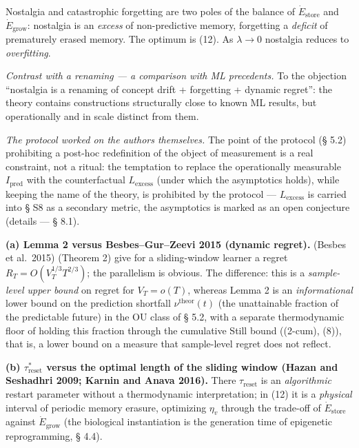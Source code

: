 \documentclass[pdflatex,sn-mathphys-ay]{sn-jnl}
\begin{document}
Nostalgia and catastrophic forgetting are two poles of the balance of \(\dot{E}_{\text{store}}\) and \(\dot{E}_{\text{grow}}\): nostalgia is an \emph{excess} of non-predictive memory, forgetting a \emph{deficit} of prematurely erased memory. The optimum is (12). As \(\lambda \to 0\) nostalgia reduces to \emph{overfitting}.



\emph{Contrast with a renaming --- a comparison with ML precedents.} To the objection ``nostalgia is a renaming of concept drift + forgetting + dynamic regret'': the theory contains constructions structurally close to known ML results, but operationally and in scale distinct from them.



\emph{The protocol worked on the authors themselves.} The point of the protocol (§ 5.2) prohibiting a post-hoc redefinition of the object of measurement is a real constraint, not a ritual: the temptation to replace the operationally measurable \(I_{\text{pred}}\) with the counterfactual \(L_{\text{excess}}\) (under which the asymptotics holds), while keeping the name of the theory, is prohibited by the protocol --- \(L_{\text{excess}}\) is carried into § S8 as a secondary metric, the asymptotics is marked as an open conjecture (details --- § 8.1).



\textbf{(a) Lemma 2 versus Besbes--Gur--Zeevi 2015 (dynamic regret).} (Besbes et al.~2015) (Theorem 2) give for a sliding-window learner a regret \(R_T = O(V_T^{1/3} T^{2/3})\); the parallelism is obvious. The difference: this is a \emph{sample-level upper bound} on regret for \(V_T = o(T)\), whereas Lemma 2 is an \emph{informational} lower bound on the prediction shortfall \(\nu^{\text{theor}}(t)\) (the unattainable fraction of the predictable future) in the OU class of § 5.2, with a separate thermodynamic floor of holding this fraction through the cumulative Still bound ((2-cum), (8)), that is, a lower bound on a measure that sample-level regret does not reflect.



\textbf{(b) \(\tau_{\text{reset}}^*\) versus the optimal length of the sliding window (Hazan and Seshadhri 2009; Karnin and Anava 2016).} There \(\tau_{\text{reset}}\) is an \emph{algorithmic} restart parameter without a thermodynamic interpretation; in (12) it is a \emph{physical} interval of periodic memory erasure, optimizing \(\eta_v\) through the trade-off of \(\dot E_{\text{store}}\) against \(\dot E_{\text{grow}}\) (the biological instantiation is the generation time of epigenetic reprogramming, § 4.4).
\end{document}
